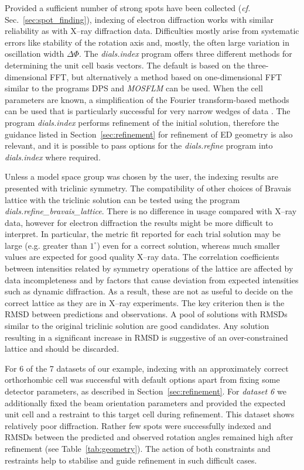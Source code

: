 \documentclass[preprint]{iucr}
\newcommand{\dialsindex}{\emph{dials.index}\xspace}
\newcommand{\dialsrefinebravaislattice}{\emph{dials.refine\_bravais\_lattice}\xspace}
\newcommand{\dialsrefine}{\emph{dials.refine}\xspace}
\newcommand{\mosflm}{\emph{MOSFLM}\xspace}
\begin{document}
Provided a sufficient number of strong spots have been collected (\emph{cf.}
Sec.~\ref{sec:spot_finding}), indexing of electron diffraction works with
similar reliability as with X--ray diffraction data. Difficulties mostly arise
from systematic errors like stability of the rotation axis and, mostly, the
often large variation in oscillation width $\Delta \Phi$.  The \dialsindex
program offers three different methods for determining the unit cell basis
vectors. The default is based on the three-dimensional FFT, but alternatively a
method based on one-dimensional FFT similar to the programs DPS
\cite{Steller1997} and \mosflm \cite{leslie2007} can be used. When the cell
parameters are known, a simplification of the Fourier transform-based methods
can be used that is particularly successful for very narrow wedges of data
\cite{Gildea2014}. The program \dialsindex performs refinement of the initial
solution, therefore the guidance listed in Section~\ref{sec:refinement} for
refinement of ED geometry is also relevant, and it is possible to pass
options for the \dialsrefine program into \dialsindex where required.

Unless a model space group was chosen by the user, the indexing results are
presented with triclinic symmetry. The compatibility of other choices of
Bravais lattice with the triclinic solution can be tested using the program
\dialsrefinebravaislattice \cite{Winter2018,Sauter2006}. There is no difference
in usage compared with X--ray data, however for electron diffraction the
results might be more difficult to interpret. In particular, the metric fit
reported for each trial solution \cite{LePage1982} may be large (e.g. greater
than $1^\circ$) even for a correct solution, whereas much smaller values are
expected for good quality X--ray data. The correlation coefficients between
intensities related by symmetry operations of the lattice are affected by data
incompleteness and by factors that cause deviation from expected intensities
such as dynamic diffraction. As a result, these are not as useful to decide
on the correct lattice as they are in X--ray experiments. The key criterion then
is the RMSD between predictions and observations. A pool of solutions with
RMSDs similar to the original triclinic solution are good candidates. Any
solution resulting in a significant increase in RMSD is suggestive of an
over-constrained lattice and should be discarded.

For 6 of the 7 datasets of our example, indexing with an approximately correct
orthorhombic cell was successful with default options apart from fixing some
detector parameters, as described in Section~\ref{sec:refinement}. For
\emph{dataset 6} we additionally fixed the beam orientation parameters and
provided the expected unit cell and a restraint to this target cell during
refinement. This dataset shows relatively poor diffraction. Rather few spots
were successfully indexed and RMSDs between the predicted and observed rotation
angles remained high after refinement (see Table~\ref{tab:geometry}).
The action of both constraints and restraints help to stabilise and
guide refinement in such difficult cases.
\end{document}
